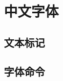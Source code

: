 \documentclass[a4paper,fontset=none]{ctexart}
\begin{document}
\section{中文字体}

\subsection{文本标记}



\subsection{字体命令}
\end{document}
